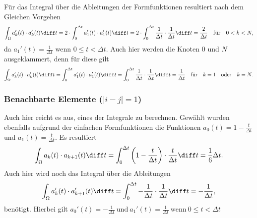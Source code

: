 Für das Integral über die Ableitungen der Formfunktionen resultiert nach dem Gleichen Vorgehen
\begin{equation*}
    \int_\Omega a_k'(t) \cdot a_k'(t) \diff t 
    = 2 \cdot \int_{0}^{\Delta t} a_1'(t) \cdot a_1'(t) \diff t
    = 2 \cdot \int_{0}^{\Delta t} \frac{1}{\Delta t} \cdot \frac{1}{\Delta t} \diff t 
    = \frac{2}{\Delta t}
    \quad \text{für} \quad 0 < k < N,
\end{equation*}
da $a_1'(t)= \frac{1}{\Delta t}$ wenn $0 \leq t < \Delta t$.
Auch hier werden die Knoten $0$ und $N$ ausgeklammert, denn für diese gilt
\begin{equation*}
    \int_\Omega a_k'(t) \cdot a_k'(t) \diff t 
    = \int_{0}^{\Delta t} a_1'(t) \cdot a_1'(t) \diff t
    = \int_{0}^{\Delta t} \frac{1}{\Delta t} \cdot \frac{1}{\Delta t} \diff t 
    = \frac{1}{\Delta t}
    \quad \text{für} \quad k = 1 \quad \text{oder} \quad k = N.
\end{equation*}

\subsubsection{Benachbarte Elemente ($|i - j| = 1$)}
Auch hier reicht es aus, eines der Integrale zu berechnen. 
Gewählt wurden ebenfalls aufgrund der einfachen Formfunktionen die Funktionen $a_0(t) = 1 - \frac{t}{\Delta t}$ und $a_1(t) = \frac{t}{\Delta t}$.
Es resultiert
\begin{equation*}
    \int_\Omega a_k(t) \cdot a_{k+1}(t) \diff t = \int_{0}^{\Delta t} \left(1 - \frac{t}{\Delta t}\right) \cdot \frac{t}{\Delta t} \diff t = \frac{1}{6} \Delta t.
\end{equation*}
Auch hier wird noch das Integral über die Ableitungen 
\begin{equation*}
    \int_\Omega a_k'(t) \cdot a_{k+1}'(t) \diff t = \int_{0}^{\Delta t} -\frac{1}{\Delta t} \cdot \frac{1}{\Delta t} \diff t = -\frac{1}{\Delta t},
\end{equation*}
benötigt.
Hierbei gilt $a_0'(t)= -\frac{1}{\Delta t} \ \text{und} \ a_1'(t)= \frac{1}{\Delta t} \ \text{wenn} \ 0 \leq t < \Delta t$

